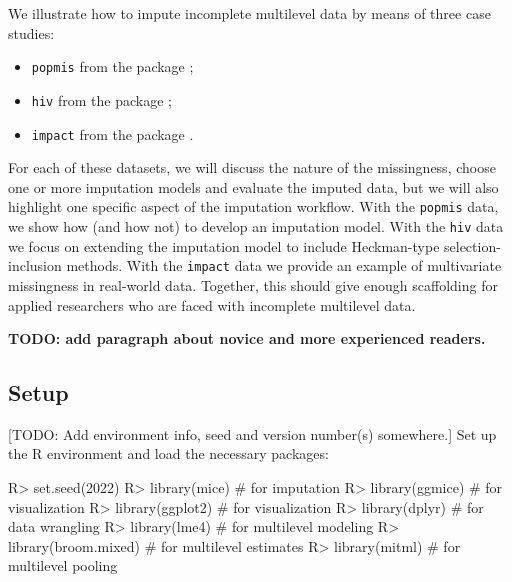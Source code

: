 \documentclass[
]{jss}
\providecommand{\tightlist}{%
  \setlength{\itemsep}{0pt}\setlength{\parskip}{0pt}}
\begin{document}
We illustrate how to impute incomplete multilevel data by means of three
case studies:

\begin{itemize}
\tightlist
\item
  \texttt{popmis} from the  package \citep[simulated data on
  perceived popularity, \(n = 2,000\) pupils across \(N = 100\)
  schools,][]{mice};
\item
  \texttt{hiv} from the  package \citep[simulated data on HIV
  diagnoses, \(n = 6,416\) patients across \(N = 9\) regions,][]{GJRM};
\item
  \texttt{impact} from the  package \citep[empirical data
  on traumatic brain injuries, \(n = 11,022\) patients across \(N = 15\)
  studies,][]{metamisc}.
\end{itemize}

For each of these datasets, we will discuss the nature of the
missingness, choose one or more imputation models and evaluate the
imputed data, but we will also highlight one specific aspect of the
imputation workflow. With the \texttt{popmis} data, we show how (and how
not) to develop an imputation model. With the \texttt{hiv} data we focus
on extending the imputation model to include Heckman-type
selection-inclusion methods. With the \texttt{impact} data we provide an
example of multivariate missingness in real-world data. Together, this
should give enough scaffolding for applied researchers who are faced
with incomplete multilevel data.

\textbf{TODO: add paragraph about novice and more experienced readers.}

\hypertarget{setup}{%
\subsection{Setup}\label{setup}}

{[}TODO: Add environment info, seed and version number(s) somewhere.{]}
Set up the R environment and load the necessary packages:

\begin{CodeChunk}
\begin{CodeInput}
R> set.seed(2022)
R> library(mice)         # for imputation
R> library(ggmice)       # for visualization
R> library(ggplot2)      # for visualization
R> library(dplyr)        # for data wrangling
R> library(lme4)         # for multilevel modeling
R> library(broom.mixed)  # for multilevel estimates
R> library(mitml)        # for multilevel pooling
\end{CodeInput}
\end{CodeChunk}
\end{document}
